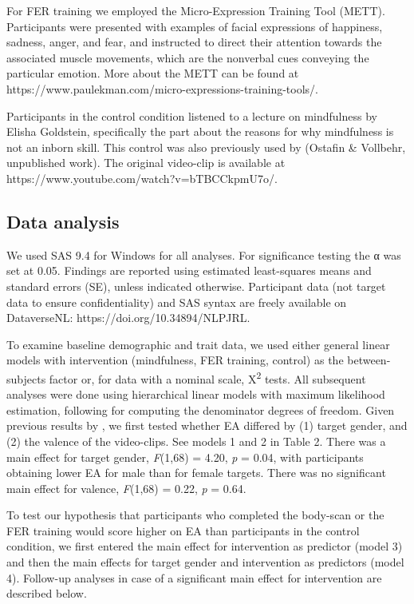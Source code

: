 \documentclass[authordate, empirical, issue]{jote-new-article}
\begin{document}
For FER training we employed the Micro-Expression Training Tool (METT). Participants were presented with examples of facial expressions of happiness, sadness, anger, and fear, and instructed to direct their attention towards the associated muscle movements, which are the nonverbal cues conveying the particular emotion. More about the METT can be found at https://www.paulekman.com/micro-expressions-training-tools/.



Participants in the control condition listened to a lecture on mindfulness by Elisha Goldstein, specifically the part about the reasons for why mindfulness is not an inborn skill. This control was also previously used by (Ostafin \& Vollbehr, unpublished work). The original video-clip is available at https://www.youtube.com/watch?v=bTBCCkpmU7o/.



\subsection{Data analysis}



We used SAS 9.4 for Windows for all analyses. For significance testing the α was set at 0.05. Findings are reported using estimated least-squares means and standard errors (SE), unless indicated otherwise. Participant data (not target data to ensure confidentiality) and SAS syntax are freely available on DataverseNL: https://doi.org/10.34894/NLPJRL.



To examine baseline demographic and trait data, we used either general linear models with intervention (mindfulness, FER training, control) as the between-subjects factor or, for data with a nominal scale, X\textsuperscript{2} tests. All subsequent analyses were done using hierarchical linear models with maximum likelihood estimation, following \textcite{Kenward1997} for computing the denominator degrees of freedom. Given previous results by \textcites{aanhetRot2014}, we first tested whether EA differed by (1) target gender, and (2) the valence of the video-clips. See models 1 and 2 in Table 2. There was a main effect for target gender, \emph{F}(1,68) = 4.20, \emph{p} = 0.04, with participants obtaining lower EA for male than for female targets. There was no significant main effect for valence, \emph{F}(1,68) = 0.22, \emph{p} = 0.64.



To test our hypothesis that participants who completed the body-scan or the FER training would score higher on EA than participants in the control condition, we first entered the main effect for intervention as predictor (model 3) and then the main effects for target gender and intervention as predictors (model 4). Follow-up analyses in case of a significant main effect for intervention are described below.
\end{document}
